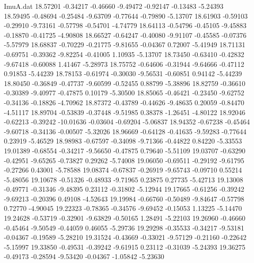 \begin{filecontents}{ImuA.dat}
  18.57201   -0.34217   -0.46660   -9.49472   -0.92147   -0.13483   -5.24393
  18.59495   -0.48694   -0.25484   -9.63709   -0.77644   -0.79890   -5.13707
  18.61903   -0.59103   -0.29910   -9.73161   -0.57798   -0.54701   -4.74779
  18.64113   -0.54796   -0.45105   -9.45883   -0.18870   -0.41725   -4.90808
  18.66527   -0.64247   -0.40080   -9.91107   -0.45585   -0.07376   -5.57979
  18.68837   -0.70229   -0.21775   -9.81655   -0.04367    0.72007   -5.41949
  18.71131   -0.69751   -0.39362   -9.82254   -0.41005    1.10935   -5.13707
  18.73450   -0.63410   -0.42832   -9.67418   -0.60088    1.41467   -5.28973
  18.75752   -0.64606   -0.31944   -9.64666   -0.47112    0.91853   -5.44239
  18.78153   -0.61974   -0.30030   -9.56531   -0.60851    0.94142   -5.44239
  18.80450   -0.36849   -0.47737   -9.60599   -0.52455    0.88799   -5.38896
  18.82759   -0.36610   -0.30389   -9.40977   -0.47875    0.10179   -5.30500
  18.85065   -0.46421   -0.23450   -9.62752   -0.34136   -0.18826   -4.70962
  18.87372   -0.43789   -0.44626   -9.48635    0.20059   -0.84470   -4.51117
  18.89704   -0.53839   -0.37448   -9.51985    0.38378   -1.26451   -4.80122
  18.92046   -0.62213   -0.39242  -10.01636   -0.03604   -0.69204   -5.06837
  18.94352   -0.67238   -0.45464   -9.60718   -0.34136   -0.00507   -5.32026
  18.96669   -0.64128   -0.41635   -9.59283   -0.77644    0.23919   -5.46529
  18.98983   -0.67597   -0.34098   -9.71366   -0.44822    0.84220   -5.33553
  19.01389   -0.68554   -0.34217   -9.56650   -0.47875    0.79640   -5.51109
  19.03707   -0.63290   -0.42951   -9.65265   -0.73827    0.29262   -5.74008
  19.06050   -0.69511   -0.29192   -9.61795   -0.27266    0.43001   -5.78588
  19.08374   -0.67837   -0.26919   -9.65743   -0.09710    0.55214   -5.48056
  19.10678   -0.51326   -0.48933   -9.71965    0.23875    0.27735   -5.42713
  19.13008   -0.49771   -0.31346   -9.48395    0.23112   -0.31802   -5.12944
  19.17665   -0.61256   -0.39242   -9.69213   -0.20396    0.49108   -4.52643
  19.19984   -0.66760   -0.50489   -9.84647   -0.57798    0.72770   -4.90045
  19.22323   -0.78365   -0.34576   -9.69452   -0.15053    1.13225   -5.14470
  19.24628   -0.53719   -0.32901   -9.63829   -0.50165    1.28491   -5.22103
  19.26960   -0.46660   -0.45464   -9.50549   -0.44059    0.46055   -5.29736
  19.29298   -0.35533   -0.34217   -9.53181   -0.04367   -0.19589   -5.28210
  19.31524   -0.43669   -0.33021   -9.57129   -0.21160   -0.22642   -5.15997
  19.33850   -0.49531   -0.39242   -9.61915    0.23112   -0.31039   -5.24393
  19.36275   -0.49173   -0.28594   -9.53420   -0.04367   -1.05842   -5.23630

\end{filecontents}
